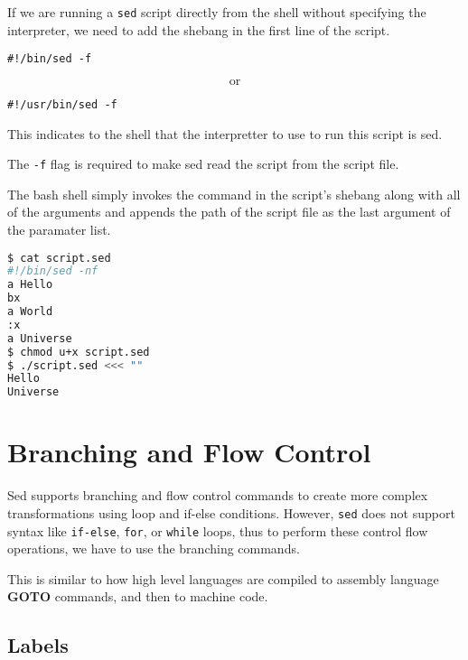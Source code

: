 If we are running a \lstinline|sed| script directly from the shell without specifying the interpreter, we need to add the shebang in the first line of the script.

\begin{lstlisting}
#!/bin/sed -f
\end{lstlisting}

\[
  \text{or}
\]

\begin{lstlisting}
#!/usr/bin/sed -f
\end{lstlisting}

This indicates to the shell that the interpretter to use to run this script is sed.

The \lstinline|-f| flag is required to make sed read the script from the script file.

\begin{remark}
  The bash shell simply invokes the command in the script's shebang along with all of the arguments and appends the path of the script file as the last argument of the paramater list.
\end{remark}

\begin{lstlisting}[language=bash]
$ cat script.sed
#!/bin/sed -nf
a Hello
bx
a World
:x
a Universe
$ chmod u+x script.sed
$ ./script.sed <<< ""
Hello
Universe
\end{lstlisting}


\section{Branching and Flow Control}

Sed supports branching and flow control commands to create more complex transformations using loop and if-else conditions.
However, \lstinline|sed| does not support syntax like \lstinline|if-else|, \lstinline|for|, or \lstinline|while| loops,
thus to perform these control flow operations, we have to use the branching commands.

This is similar to how high level languages are compiled to assembly language \textbf{GOTO} commands, and then to machine code.

\subsection{Labels}

